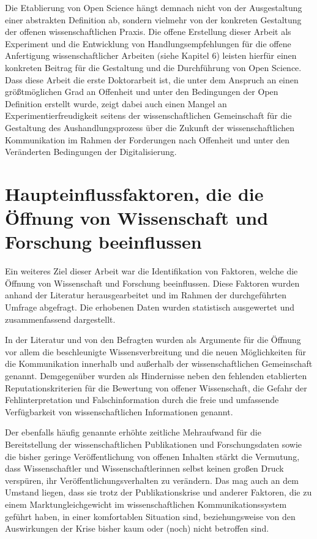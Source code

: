 Die Etablierung von Open Science hängt demnach nicht von der Ausgestaltung einer abstrakten Definition ab, sondern vielmehr von der konkreten Gestaltung der offenen wissenschaftlichen Praxis. Die offene Erstellung dieser Arbeit als Experiment und die Entwicklung von Handlungsempfehlungen für die offene Anfertigung wissenschaftlicher Arbeiten (siehe Kapitel 6) leisten hierfür einen konkreten Beitrag für die Gestaltung und die Durchführung von Open Science. Dass diese Arbeit die erste Doktorarbeit ist, die unter dem Anspruch an einen größtmöglichen Grad an Offenheit und unter den Bedingungen der Open Definition erstellt wurde, zeigt dabei auch einen Mangel an Experimentierfreudigkeit seitens der wissenschaftlichen Gemeinschaft für die Gestaltung des Aushandlungsprozess über die Zukunft der wissenschaftlichen Kommunikation im Rahmen der Forderungen nach Offenheit und unter den Veränderten Bedingungen der Digitalisierung.

\section{Haupteinflussfaktoren, die die Öffnung von Wissenschaft und Forschung beeinflussen}

Ein weiteres Ziel dieser Arbeit war die Identifikation von Faktoren, welche die Öffnung von Wissenschaft und Forschung beeinflussen. Diese Faktoren wurden anhand der Literatur herausgearbeitet und im Rahmen der durchgeführten Umfrage abgefragt. Die erhobenen Daten wurden statistisch ausgewertet und zusammenfassend dargestellt.

In der Literatur und von den Befragten wurden als Argumente für die Öffnung vor allem die beschleunigte Wissensverbreitung und die neuen Möglichkeiten für die Kommunikation innerhalb und außerhalb der wissenschaftlichen Gemeinschaft genannt. Demgegenüber wurden als Hindernisse neben den fehlenden etablierten Reputationskriterien für die Bewertung von offener Wissenschaft, die Gefahr der Fehlinterpretation und Falschinformation durch die freie und umfassende Verfügbarkeit von wissenschaftlichen Informationen genannt.

Der ebenfalls häufig genannte erhöhte zeitliche Mehraufwand für die Bereitstellung der wissenschaftlichen Publikationen und Forschungsdaten sowie die bisher geringe Veröffentlichung von offenen Inhalten stärkt die Vermutung, dass Wissenschaftler und Wissenschaftlerinnen selbst keinen großen Druck verspüren, ihr Veröffentlichungsverhalten zu verändern. Das mag auch an dem Umstand liegen, dass sie trotz der Publikationskrise und anderer Faktoren, die zu einem Marktungleichgewicht im wissenschaftlichen Kommunikationssystem geführt haben, in einer komfortablen Situation sind, beziehungsweise von den Auswirkungen der Krise bisher kaum oder (noch) nicht betroffen sind.

